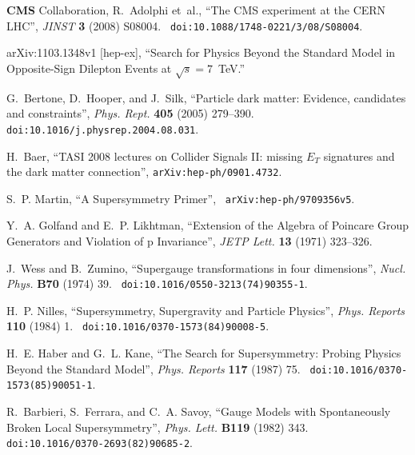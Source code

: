 \providecommand{\href}[2]{#2}\begingroup\raggedright\begin{thebibliography}{10}

{\bf CMS} Collaboration, R.~Adolphi {et~al.}, ``{The CMS experiment at the CERN
  LHC}'', {\em JINST} {\bf 3} (2008)
S08004.
  \href{http://dx.doi.org/10.1088/1748-0221/3/08/S08004}{{\tt
  doi:10.1088/1748-0221/3/08/S08004}}.

arXiv:1103.1348v1 [hep-ex], ``Search for Physics Beyond the Standard Model in Opposite-Sign Dilepton Events at $\sqrt{s} = 7$~TeV.''

G.~Bertone, D.~Hooper, and J.~Silk, ``{Particle dark matter: Evidence,
  candidates and constraints}'', {\em Phys. Rept.} {\bf 405} (2005)
279--390.
  \href{http://dx.doi.org/10.1016/j.physrep.2004.08.031}{{\tt
  doi:10.1016/j.physrep.2004.08.031}}.

H.~Baer, ``{TASI 2008 lectures on Collider Signals II: missing $E_T$ signatures
  and the dark matter connection}'',
\href{http://www.arXiv.org/abs/hep-ph/0901.4732}{{\tt arXiv:hep-ph/0901.4732}}.

S.~P. Martin, ``A Supersymmetry Primer'',
  \href{http://www.arXiv.org/abs/hep-ph/9709356v5}{{\tt
  arXiv:hep-ph/9709356v5}}.

Y.~A. Golfand and E.~P. Likhtman, ``Extension of the Algebra of Poincare Group
  Generators and Violation of p Invariance'', {\em JETP Lett.} {\bf 13} (1971)
  323--326.

J.~Wess and B.~Zumino, ``Supergauge transformations in four dimensions'', {\em
  Nucl. Phys.} {\bf B70} (1974) 39.
  \href{http://dx.doi.org/10.1016/0550-3213(74)90355-1}{{\tt
  doi:10.1016/0550-3213(74)90355-1}}.

H.~P. Nilles, ``Supersymmetry, Supergravity and Particle Physics'', {\em Phys.
  Reports} {\bf 110} (1984) 1.
  \href{http://dx.doi.org/10.1016/0370-1573(84)90008-5}{{\tt
  doi:10.1016/0370-1573(84)90008-5}}.

H.~E. Haber and G.~L. Kane, ``The Search for Supersymmetry: Probing Physics
  Beyond the Standard Model'', {\em Phys. Reports} {\bf 117} (1987) 75.
  \href{http://dx.doi.org/10.1016/0370-1573(85)90051-1}{{\tt
  doi:10.1016/0370-1573(85)90051-1}}.

R.~Barbieri, S.~Ferrara, and C.~A. Savoy, ``{Gauge Models with Spontaneously
  Broken Local Supersymmetry}'', {\em Phys. Lett.} {\bf B119} (1982) 343.
  \href{http://dx.doi.org/10.1016/0370-2693(82)90685-2}{{\tt
  doi:10.1016/0370-2693(82)90685-2}}.


\end{thebibliography}
